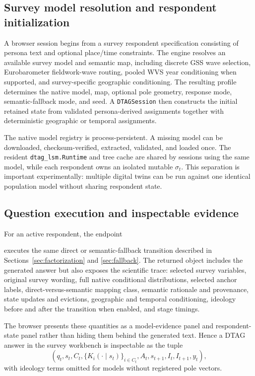 \documentclass[journal]{IEEEtran}
\newcommand{\1}{\mathbf{1}}
\begin{document}
\subsection{Survey model resolution and respondent initialization}

A browser session begins from a survey respondent specification consisting of persona text and optional place/time constraints. The engine resolves an available survey model and semantic map, including discrete GSS wave selection, Eurobarometer fieldwork-wave routing, pooled WVS year conditioning when supported, and survey-specific geographic conditioning. The resulting profile determines the native model, map, optional pole geometry, response mode, semantic-fallback mode, and seed. A \texttt{DTAGSession} then constructs the initial retained state from validated persona-derived assignments together with deterministic geographic or temporal assignments.

The native model registry is process-persistent. A missing model can be downloaded, checksum-verified, extracted, validated, and loaded once. The resident \texttt{dtag\_lsm.Runtime} and tree cache are shared by sessions using the same model, while each respondent owns an isolated mutable $\sigma_t$. This separation is important experimentally: multiple digital twins can be run against one identical population model without sharing respondent state.

\subsection{Question execution and inspectable evidence}

For an active respondent, the endpoint
\begin{center}
\end{center}
executes the same direct or semantic-fallback transition described in Sections~\ref{sec:factorization} and \ref{sec:fallback}. The returned object includes the generated answer but also exposes the scientific trace: selected survey variables, original survey wording, full native conditional distributions, selected anchor labels, direct-versus-semantic mapping class, semantic rationale and provenance, state updates and evictions, geographic and temporal conditioning, ideology before and after the transition when enabled, and stage timings.

The browser presents these quantities as a model-evidence panel and respondent-state panel rather than hiding them behind the generated text. Hence a DTAG answer in the survey workbench is inspectable as the tuple
\begin{equation}
  \left(q_t,s_t,C_t,\{K_i(\cdot\mid s_t)\}_{i\in C_t},A_t,s_{t+1},I_t,I_{t+1},y_t\right),
  \label{eq:webtrace}
\end{equation}
with ideology terms omitted for models without registered pole vectors.
\end{document}
